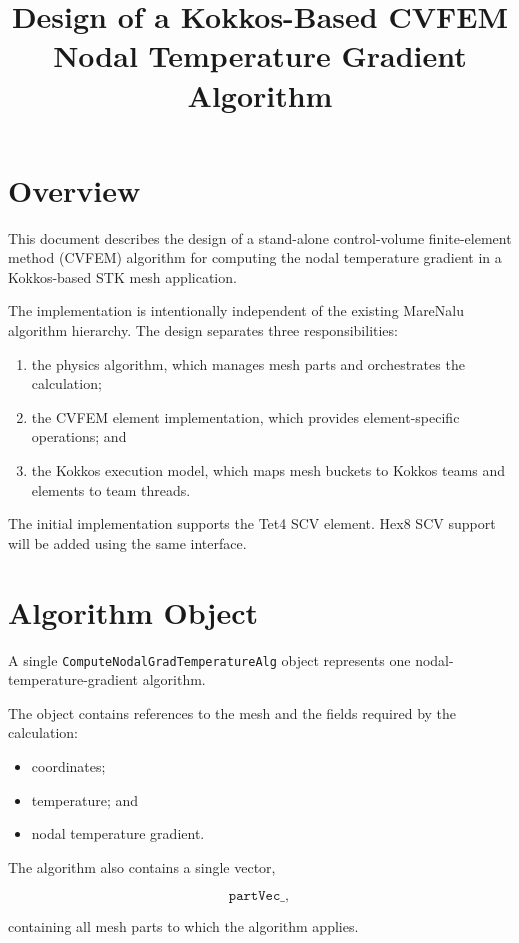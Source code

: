 \documentclass[11pt]{article}
\title{Design of a Kokkos-Based CVFEM Nodal Temperature Gradient Algorithm}
\author{}
\date{}
\begin{document}
\maketitle

\section{Overview}

This document describes the design of a stand-alone
control-volume finite-element method (CVFEM) algorithm for
computing the nodal temperature gradient in a Kokkos-based
STK mesh application.

The implementation is intentionally independent of the existing
MareNalu algorithm hierarchy.  The design separates three
responsibilities:

\begin{enumerate}
\item the physics algorithm, which manages mesh parts and
orchestrates the calculation;
\item the CVFEM element implementation, which provides
element-specific operations; and
\item the Kokkos execution model, which maps mesh buckets to
Kokkos teams and elements to team threads.
\end{enumerate}

The initial implementation supports the Tet4 SCV element.
Hex8 SCV support will be added using the same interface.

\section{Algorithm Object}

A single
\texttt{ComputeNodalGradTemperatureAlg}
object represents one nodal-temperature-gradient algorithm.

The object contains references to the mesh and the fields required
by the calculation:

\begin{itemize}
\item coordinates;
\item temperature; and
\item nodal temperature gradient.
\end{itemize}

The algorithm also contains a single vector,

$$
\texttt{partVec\_},
$$

containing all mesh parts to which the algorithm applies.
\end{document}
